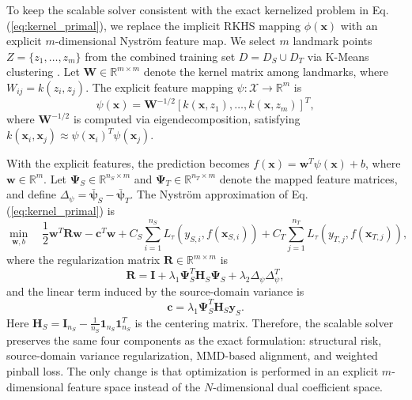 \documentclass[a4paper]{cas-sc}
\begin{document}
To keep the scalable solver consistent with the exact kernelized problem in Eq. (\ref{eq:kernel_primal}), we replace the implicit RKHS mapping $\phi(\boldsymbol{x})$ with an explicit $m$-dimensional Nystr\"{o}m feature map. We select $m$ landmark points $Z = \{z_1, \ldots, z_m\}$ from the combined training set $D = D_S \cup D_T$ via K-Means clustering \citep{zhang2010clustered}. Let $\boldsymbol{W} \in \mathbb{R}^{m \times m}$ denote the kernel matrix among landmarks, where $W_{ij} = k(z_i, z_j)$. The explicit feature mapping $\psi: \mathcal{X} \to \mathbb{R}^m$ is
\begin{equation}
\label{eq:nystrom_feature}
\psi(\boldsymbol{x}) = \boldsymbol{W}^{-1/2} [k(\boldsymbol{x}, z_1), \ldots, k(\boldsymbol{x}, z_m)]^T,
\end{equation}
where $\boldsymbol{W}^{-1/2}$ is computed via eigendecomposition, satisfying $k(\boldsymbol{x}_i, \boldsymbol{x}_j) \approx \psi(\boldsymbol{x}_i)^T \psi(\boldsymbol{x}_j)$.

With the explicit features, the prediction becomes $f(\boldsymbol{x}) = \boldsymbol{w}^T \psi(\boldsymbol{x}) + b$, where $\boldsymbol{w} \in \mathbb{R}^m$. Let $\boldsymbol{\Psi}_S \in \mathbb{R}^{n_S \times m}$ and $\boldsymbol{\Psi}_T \in \mathbb{R}^{n_T \times m}$ denote the mapped feature matrices, and define $\Delta_{\psi} = \bar{\boldsymbol{\psi}}_S - \bar{\boldsymbol{\psi}}_T$. The Nystr\"{o}m approximation of Eq. (\ref{eq:kernel_primal}) is
\begin{equation}
\label{eq:nystrom_primal}
\min_{\boldsymbol{w}, b} \quad \frac{1}{2}\boldsymbol{w}^T \boldsymbol{R} \boldsymbol{w} - \boldsymbol{c}^T \boldsymbol{w}
+ C_S \sum_{i=1}^{n_S} L_{\tau}(y_{S,i}, f(\boldsymbol{x}_{S,i}))
+ C_T \sum_{j=1}^{n_T} L_{\tau}(y_{T,j}, f(\boldsymbol{x}_{T,j})),
\end{equation}
where the regularization matrix $\boldsymbol{R} \in \mathbb{R}^{m \times m}$ is
\begin{equation}
\label{eq:reg_matrix}
\boldsymbol{R} = \boldsymbol{I} + \lambda_1 \boldsymbol{\Psi}_S^T \boldsymbol{H}_S \boldsymbol{\Psi}_S + \lambda_2 \Delta_{\psi}\Delta_{\psi}^T,
\end{equation}
and the linear term induced by the source-domain variance is
\begin{equation}
\label{eq:nystrom_linear}
\boldsymbol{c} = \lambda_1 \boldsymbol{\Psi}_S^T \boldsymbol{H}_S \boldsymbol{y}_S.
\end{equation}
Here $\boldsymbol{H}_S = \boldsymbol{I}_{n_S} - \frac{1}{n_S} \boldsymbol{1}_{n_S} \boldsymbol{1}_{n_S}^T$ is the centering matrix. Therefore, the scalable solver preserves the same four components as the exact formulation: structural risk, source-domain variance regularization, MMD-based alignment, and weighted pinball loss. The only change is that optimization is performed in an explicit $m$-dimensional feature space instead of the $N$-dimensional dual coefficient space.
\end{document}
